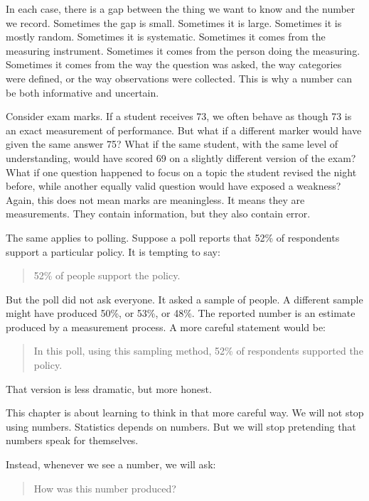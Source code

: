 \documentclass[
  letterpaper,
  DIV=11,
  numbers=noendperiod]{scrreprt}
\begin{document}
In each case, there is a gap between the thing we want to know and the
number we record. Sometimes the gap is small. Sometimes it is large.
Sometimes it is mostly random. Sometimes it is systematic. Sometimes it
comes from the measuring instrument. Sometimes it comes from the person
doing the measuring. Sometimes it comes from the way the question was
asked, the way categories were defined, or the way observations were
collected. This is why a number can be both informative and uncertain.

Consider exam marks. If a student receives 73, we often behave as though
73 is an exact measurement of performance. But what if a different
marker would have given the same answer 75? What if the same student,
with the same level of understanding, would have scored 69 on a slightly
different version of the exam? What if one question happened to focus on
a topic the student revised the night before, while another equally
valid question would have exposed a weakness? Again, this does not mean
marks are meaningless. It means they are measurements. They contain
information, but they also contain error.

The same applies to polling. Suppose a poll reports that 52\% of
respondents support a particular policy. It is tempting to say:

\begin{quote}
52\% of people support the policy.
\end{quote}

But the poll did not ask everyone. It asked a sample of people. A
different sample might have produced 50\%, or 53\%, or 48\%. The
reported number is an estimate produced by a measurement process. A more
careful statement would be:

\begin{quote}
In this poll, using this sampling method, 52\% of respondents supported
the policy.
\end{quote}

That version is less dramatic, but more honest.

This chapter is about learning to think in that more careful way. We
will not stop using numbers. Statistics depends on numbers. But we will
stop pretending that numbers speak for themselves.

Instead, whenever we see a number, we will ask:

\begin{quote}
How was this number produced?
\end{quote}
\end{document}
